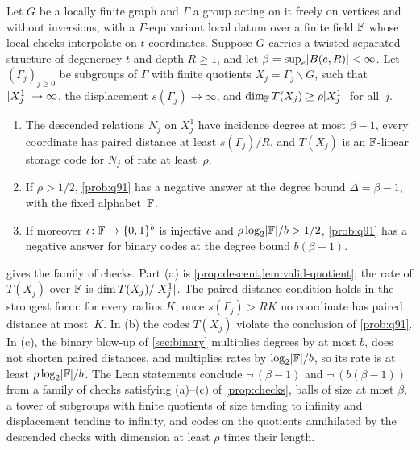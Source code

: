 \begin{theorem}[Theorem T]\label{thm:T}
Let $G$ be a locally finite graph and $\Gamma$ a group acting on it freely on vertices and without inversions, with a
$\Gamma$-equivariant local datum over a finite field $\mathbb{F}$ whose local checks interpolate on $t$ coordinates. Suppose $G$
carries a twisted separated structure of degeneracy $t$ and depth $R\ge1$, and let $\beta=\sup_e\lvert B(e,R) \rvert<\infty$.
Let $(\Gamma_j)_{j\ge0}$ be subgroups of $\Gamma$ with finite quotients $X_j=\Gamma_j\backslash G$, such that
$\lvert X_j^1 \rvert\to\infty$, the displacement $s(\Gamma_j)\to\infty$, and $\dim_{\mathbb{F}} T(X_j)\ge\rho\lvert X_j^1 \rvert$ for all~$j$.
\begin{enumerate}[label=(\alph*)]
\item The descended relations $N_j$ on $X_j^1$ have incidence degree at most $\beta-1$, every coordinate has paired
distance at least $s(\Gamma_j)/R$, and $T(X_j)$ is an $\mathbb{F}$-linear storage code for $N_j$ of rate at least~$\rho$.
\item If $\rho>1/2$, \cref{prob:q91} has a negative answer at the degree bound $\Delta=\beta-1$, with the fixed alphabet~$\mathbb{F}$.
\item If moreover $\iota\colon\mathbb{F}\to\{0,1\}^b$ is injective and $\rho\log_2\lvert \mathbb{F} \rvert/b>1/2$, \cref{prob:q91} has a negative answer
for binary codes at the degree bound $b(\beta-1)$.
\end{enumerate}
\end{theorem}
\begin{outline}
 gives the family of checks. Part (a) is \cref{prop:descent,lem:valid-quotient}; the rate of $T(X_j)$
over $\mathbb{F}$ is $\dim T(X_j)/\lvert X_j^1 \rvert$. The paired-distance condition holds in the strongest form: for every radius $K$,
once $s(\Gamma_j)>RK$ no coordinate has paired distance at most~$K$. In (b) the codes $T(X_j)$ violate the conclusion of
\cref{prob:q91}. In (c), the binary blow-up of \cref{sec:binary} multiplies degrees by at most $b$, does not shorten paired
distances, and multiplies rates by $\log_2\lvert \mathbb{F} \rvert/b$, so its rate is at least $\rho\log_2\lvert \mathbb{F} \rvert/b$. The Lean statements conclude
$\neg\,$$(\beta-1)$ and $\neg\,$$(b(\beta-1))$ from a family of
checks satisfying (a)--(c) of \cref{prop:checks}, balls of size at most $\beta$, a tower of subgroups with finite
quotients of size tending to infinity and displacement tending to infinity, and codes on the quotients annihilated by
the descended checks with dimension at least $\rho$ times their length.
\end{outline}

